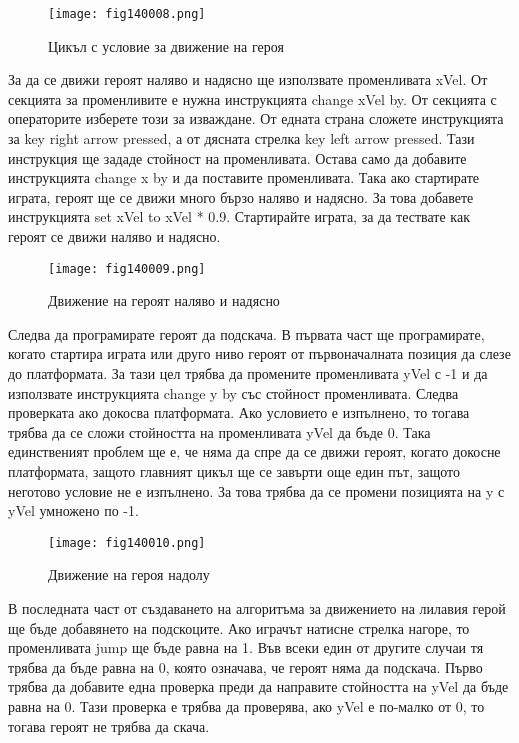 \begin{figure}[H]
  \centering
  \texttt{[image: fig140008.png]}
  \caption{Цикъл с условие за движение на героя}
\label{fig140008}
\end{figure}

За да се движи героят наляво и надясно ще използвате променливата xVel. От секцията за променливите е нужна инструкцията change xVel by. От секцията с операторите изберете този за изваждане. От едната страна сложете инструкцията за key right arrow pressed, а от дясната стрелка key left arrow pressed. Тази инструкция ще зададе стойност на променливата. Остава само да добавите инструкцията change x by и да поставите променливата. Така ако стартирате играта, героят ще се движи много бързо наляво и надясно. За това добавете инструкцията set xVel to xVel * 0.9. Стартирайте играта, за да тествате как героят се движи наляво и надясно.

\begin{figure}[H]
  \centering
  \texttt{[image: fig140009.png]}
  \caption{Движение на героят наляво и надясно}
\label{fig140009}
\end{figure}

Следва да програмирате героят да подскача. В първата част ще програмирате, когато стартира играта или друго ниво героят от първоначалната позиция да слезе до платформата. За тази цел трябва да промените променливата yVel с -1 и да използвате инструкцията change y by със стойност променливата. Следва проверката ако докосва платформата. Ако условието е изпълнено, то тогава трябва да се сложи стойността на променливата yVel да бъде 0. Така единственият проблем ще е, че няма да спре да се движи героят, когато докосне платформата, защото главният цикъл ще се завърти още един път, защото неготово условие не е изпълнено. За това трябва да се промени позицията на y с yVel умножено по -1.

\begin{figure}[H]
  \centering
  \texttt{[image: fig140010.png]}
  \caption{Движение на героя надолу}
\label{fig140010}
\end{figure}

В последната част от създаването на алгоритъма за движението на лилавия герой ще бъде добавянето на подскоците. Ако играчът натисне стрелка нагоре, то променливата jump ще бъде равна на 1. Във всеки един от другите случаи тя трябва да бъде равна на 0, която означава, че героят няма да подскача. Първо трябва да добавите една проверка преди да направите стойността на yVel да бъде равна на 0. Тази проверка е трябва да проверява, ако yVel е по-малко от 0, то тогава героят не трябва да скача.

